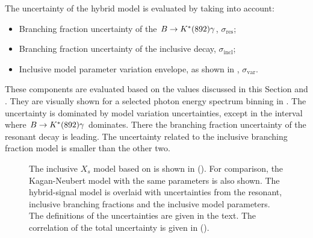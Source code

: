 The uncertainty of the hybrid model is evaluated by taking into account:
\begin{itemize}
    \item Branching fraction uncertainty of the $B\rightarrow K^*(892)\gamma$, $\sigma_{\mathrm{res}}$;
    \item Branching fraction uncertainty of the inclusive \BtoXsgamma decay, $\sigma_{\mathrm{incl}}$;
    \item Inclusive model parameter variation envelope, as shown in , $\sigma_{\mathrm{var}}$.
\end{itemize}
These components are evaluated based on the values discussed in this Section and .
They are visually shown for a selected \BtoXsgamma photon energy spectrum binning in .
The uncertainty is dominated by \BtoXsgamma model variation uncertainties, except in the interval where $B\rightarrow K^*(892)\gamma$ dominates.
There the branching fraction uncertainty of the resonant decay is leading.
The uncertainty related to the \BtoXsgamma inclusive branching fraction model is smaller than the other two.
\begin{figure}[hbtp!]
    \centering
    \caption{\label{fig:hybrid_uncertainty_all}
    The inclusive $X_s$ model based on  is shown in ().
    For comparison, the Kagan-Neubert model with the same parameters is also shown.
    The hybrid-signal model is overlaid with uncertainties from the resonant, inclusive branching fractions and the inclusive model parameters.
    The definitions of the uncertainties are given in the text.
    The correlation of the total uncertainty is given in ().
    }
\end{figure}


